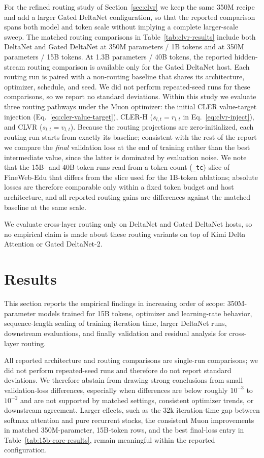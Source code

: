 \documentclass{article}
\begin{document}
For the refined routing study of Section~\ref{sec:clvr} we keep the same 350M recipe and add a larger Gated DeltaNet configuration, so that the reported comparison spans both model and token scale without implying a complete larger-scale sweep. The matched routing comparisons in Table~\ref{tab:clvr-results} include both DeltaNet and Gated DeltaNet at 350M parameters / 1B tokens and at 350M parameters / 15B tokens. At 1.3B parameters / 40B tokens, the reported hidden-stream routing comparison is available only for the Gated DeltaNet host. Each routing run is paired with a non-routing baseline that shares its architecture, optimizer, schedule, and seed. We did not perform repeated-seed runs for these comparisons, so we report no standard deviations. Within this study we evaluate three routing pathways under the Muon optimizer: the initial CLER value-target injection (Eq.~\eqref{eq:cler-value-target}), CLER-H ($s_{l,t}=r_{l,t}$ in Eq.~\eqref{eq:clvr-inject}), and CLVR ($s_{l,t}=v_{l,t}$). Because the routing projections are zero-initialized, each routing run starts from exactly its baseline; consistent with the rest of the report we compare the \emph{final} validation loss at the end of training rather than the best intermediate value, since the latter is dominated by evaluation noise. We note that the 15B- and 40B-token runs read from a token-count (\texttt{\_tc}) slice of FineWeb-Edu that differs from the slice used for the 1B-token ablations; absolute losses are therefore comparable only within a fixed token budget and host architecture, and all reported routing gains are differences against the matched baseline at the same scale.


We evaluate cross-layer routing only on DeltaNet and Gated DeltaNet hosts, so no empirical claim is made about these routing variants on top of Kimi Delta Attention or Gated DeltaNet-2.

\section{Results}
\label{sec:results}

This section reports the empirical findings in increasing order of scope: 350M-parameter models trained for 15B tokens, optimizer and learning-rate behavior, sequence-length scaling of training iteration time, larger DeltaNet runs, downstream evaluations, and finally validation and residual analysis for cross-layer routing.

All reported architecture and routing comparisons are single-run comparisons; we did not perform repeated-seed runs and therefore do not report standard deviations. We therefore abstain from drawing strong conclusions from small validation-loss differences, especially when differences are below roughly $10^{-3}$ to $10^{-2}$ and are not supported by matched settings, consistent optimizer trends, or downstream agreement. Larger effects, such as the 32k iteration-time gap between softmax attention and pure recurrent stacks, the consistent Muon improvements in matched 350M-parameter, 15B-token rows, and the best final-loss entry in Table~\ref{tab:15b-core-results}, remain meaningful within the reported configuration.
\end{document}
